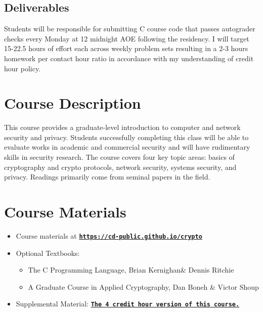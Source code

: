 \documentclass[11pt]{article}
\begin{document}
\subsection*{Deliverables} Students will be responsible for submitting C course code that passes autograder checks every Monday at 12 midnight AOE following the residency. I will target 15-22.5 hours of effort each across weekly problem sets resulting in a 2-3 hours homework per contact hour ratio in accordance with my understanding of credit hour policy.


\section*{Course Description}

This course provides a graduate-level introduction to computer and network security and privacy. Students successfully completing this class will be able to evaluate works in academic and commercial security and will have rudimentary skills in security research. The course covers four key topic areas: basics of cryptography and crypto protocols, network security, systems security, and privacy. Readings primarily come from seminal papers in the field. 


\section*{Course Materials}

\begin{itemize}
\item Course materials at \href{https://cd-public.github.io/crypto/}{\tt\bf https://cd-public.github.io/crypto}
\item Optional Textbooks: 
\begin{itemize}
\item The C Programming Language, Brian Kernighan\& Dennis Ritchie
\item A Graduate Course in Applied Cryptography, Dan Boneh \& Victor Shoup
\end{itemize}
\item Supplemental Material: \href{https://cd-public.github.io/courses/old/c89s25/index.html/}{\tt\bf The 4 credit hour version of this course.}
\end{itemize}
\end{document}
